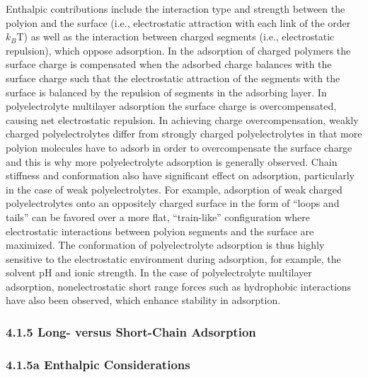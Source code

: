 \documentclass[journal=mamobx,manuscript=article]{achemso}
\begin{document}
Enthalpic contributions include the interaction type and strength between the polyion and the surface (i.e., electrostatic attraction with each link of the order $k_B$T) as well as the interaction between charged segments (i.e., electrostatic repulsion), which oppose adsorption.\cite{Hoogeveen1996,VonGoeler1994}  In the adsorption of charged polymers the surface charge is compensated when the adsorbed charge balances with the surface charge such that the electrostatic attraction of the segments with the surface is balanced by the repulsion of segments in the adsorbing layer.  In polyelectrolyte multilayer adsorption the surface charge is overcompensated, causing net electrostatic repulsion.  In achieving charge overcompensation, weakly charged polyelectrolytes differ from strongly charged polyelectrolytes in that more polyion molecules have to adsorb in order to overcompensate the surface charge and this is why more polyelectrolyte adsorption is generally observed.  Chain stiffness and conformation also have significant effect on adsorption, particularly in the case of weak polyelectrolytes.\cite{Dzubiella2003}  For example, adsorption of weak charged polyelectrolytes onto an oppositely charged surface in the form of “loops and tails” can be favored over a more flat, “train-like” configuration where electrostatic interactions between polyion segments and the surface are maximized. \cite{Borisov1994}  The conformation of polyelectrolyte adsorption is thus highly sensitive to the electrostatic environment during adsorption, for example, the solvent pH and ionic strength.\cite{Notley2004}  In the case of polyelectrolyte multilayer adsorption, nonelectrostatic short range forces such as hydrophobic interactions have also been observed, which enhance stability in adsorption.\cite{Kotov1999}  


\subsubsection{4.1.5 Long- versus Short-Chain Adsorption }

\subsubsection{4.1.5a Enthalpic Considerations}
\end{document}
